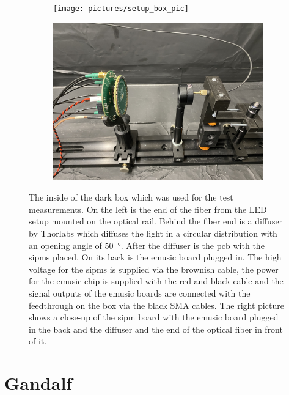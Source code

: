 \begin{figure}
	\centering
	\begin{subfigure}[b]{0.48\textwidth}
		\centering
		\texttt{[image: pictures/setup\_box\_pic]}
		\caption{}
		\label{}
	\end{subfigure}
	\begin{subfigure}[b]{0.48\textwidth}
		\centering
		\includegraphics[width=1.\textwidth]{pictures/setup_box_pic_close}
		\caption{}
		\label{}
	\end{subfigure}
	\caption[Picture of the inside of the dark box.]{The inside of the dark box which was used for the test measurements. On the left is the end of the fiber from the LED setup mounted on the optical rail. Behind the fiber end is a diffuser by Thorlabs which diffuses the light in a circular distribution with an opening angle of \SI{50}{\degree}. After the diffuser is the \ac{pcb} with the \acp{sipm} placed. On its back is the \ac{emusic} board plugged in. The high voltage for the \acp{sipm} is supplied via the brownish cable, the power for the \ac{emusic} chip is supplied with the red and black cable and the signal outputs of the \ac{emusic} boards are connected with the feedthrough on the box via the black SMA cables. The right picture shows a close-up of the \ac{sipm} board with the \ac{emusic} board plugged in the back and the diffuser and the end of the optical fiber in front of it.}
	\label{fig:setup_box_pic}
\end{figure}

\section{Gandalf}

